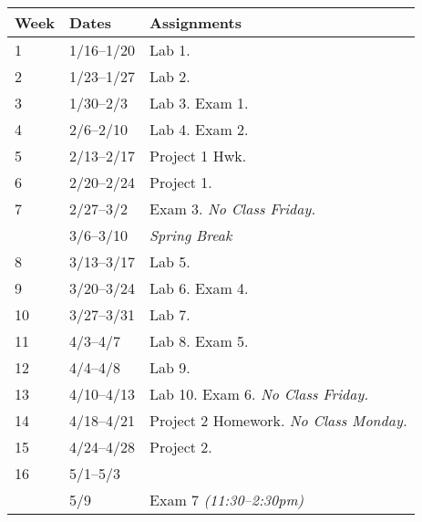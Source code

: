 \documentclass[10pt]{article}
\begin{document}
\begin{center}
\begin{tabular}{lll}
Week & Dates & Assignments \\ \toprule
1 & 1/16--1/20 &  Lab 1.  \\
2 & 1/23--1/27 & Lab 2.   \\
3 & 1/30--2/3 & Lab 3. Exam 1. \\
4 & 2/6--2/10 & Lab 4. Exam 2.\\
5 & 2/13--2/17 & Project 1 Hwk. \\
6 & 2/20--2/24 & Project 1. \\
7 & 2/27--3/2 & Exam 3.
\textit{No Class Friday.} \\
  & 3/6--3/10 & \textit{Spring Break} \\
8 & 3/13--3/17 & Lab 5. \\
9 & 3/20--3/24 & Lab 6. Exam 4. \\
10 & 3/27--3/31 & Lab 7.  \\
11 & 4/3--4/7 & Lab 8. Exam 5.  \\
12 & 4/4--4/8 & Lab 9.  \\
13 & 4/10--4/13 & Lab 10. Exam 6. \textit{No Class Friday.}   \\
14 & 4/18--4/21 & Project 2 Homework. \textit{No Class Monday.}    \\
15 & 4/24--4/28 &  Project 2. \\
16 & 5/1--5/3 &   \\ \midrule
  & 5/9 & Exam 7 \textit{(11:30--2:30pm)}  \\
\end{tabular}
\end{center}
\end{document}
